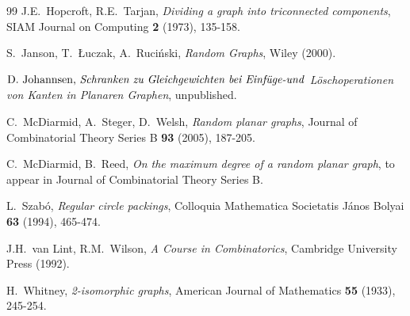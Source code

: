\documentclass{article}
\newtheorem{Proof of Theorem}{Proof of Theorem}
\begin{document}
\begin{thebibliography}{99}
 J.E.~Hopcroft, R.E.~Tarjan,
\textit{Dividing a graph into triconnected components},
SIAM Journal on Computing \textbf{2} (1973), 135-158.

 S.~Janson, T.~\L uczak, A.~Ruci\'nski, 
\textit{Random Graphs}, 
Wiley (2000).

 $\textrm{D.~Johannsen,
\textit{Schranken zu Gleichgewichten bei Einf\"uge-und}}$
\textit{L\"oschoperationen von Kanten in Planaren Graphen},
unpublished.

 C.~McDiarmid, A.~Steger, D.~Welsh, 
\textit{Random planar graphs}, 
Journal of Combinatorial Theory Series B \textbf{93} (2005), 187-205.

 C.~McDiarmid, B.~Reed, 
\textit{On the maximum degree of a random planar graph}, 
to appear in Journal of Combinatorial Theory Series B.

 L.~Szab\'o,
\textit{Regular circle packings},
Colloquia Mathematica Societatis J\'anos Bolyai \textbf{63} (1994), 465-474.

 J.H.~van Lint, R.M.~Wilson,
\textit{A Course in Combinatorics},
Cambridge University Press (1992).

 H.~Whitney, 
\textit{2-isomorphic graphs}, 
American Journal of Mathematics \textbf{55} (1933), 245-254.





\end{thebibliography}
\end{document}
